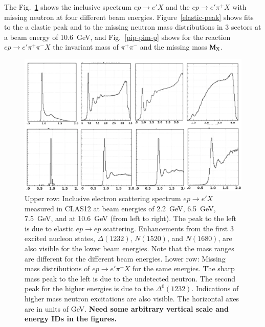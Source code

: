 \documentclass[final,3p,twocolumn]{elsarticle}
\begin{document}
The Fig.~\ref{spectrum} shows the inclusive spectrum $ep \to e' X$ and the $ep \to e' \pi^+ X$ with missing
neutron at four different beam energies. Figure~\ref{elastic-peak} shows fits to the a elastic peak and to the missing
neutron mass distributions in 3 sectors at a beam energy of 10.6~GeV, and Fig.~\ref{pip-pim-p} shows for the reaction
$ep \to e' \pi^+ \pi^- X$ the invariant mass of $\pi^+\pi^-$ and the missing mass $\rm M_X$.  

\begin{figure}[ht]
\centerline{\includegraphics[width=1.0\columnwidth]{W-spectrum.png}}
\caption{Upper row: Inclusive electron scattering spectrum $ep \to e' X$ measured in CLAS12 at beam energies 
of 2.2~GeV, 6.5~GeV, 7.5~GeV, and at 10.6~GeV (from left to right). The peak to the left is due to elastic $ep \to ep$
scattering. Enhancements from the first 3 excited nucleon states, $\Delta(1232)$, $N(1520)$, and $N(1680)$, are also
visible for the lower beam energies. Note that the mass ranges  are different for the different beam energies. Lower
row:  Missing mass distributions of $ep\to e' \pi^+X$ for the same energies. The sharp mass peak to the left is due
to the undetected neutron. The second peak for the higher energies is due to the $\Delta^0(1232)$. Indications of higher
mass neutron excitations are also visible. The horizontal axes are in units of GeV. {\bf Need some arbitrary vertical
scale and energy IDs in the figures.}} 
\label{spectrum}
\end{figure} 
\end{document}
